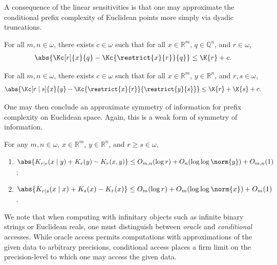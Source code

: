A consequence of the linear sensitivities is that one may approximate the conditional prefix complexity of Euclidean points more simply via dyadic truncations.

\begin{lemma}
    \label{maxmin_truncation_for_r}
    For all $m, n \in \omega$, there exists $c \in \omega$ such that for all $x \in \mathbb{R}^m$, $q \in \mathbb{Q}^n$, and $r \in \omega$,
    \begin{align*}
        \abs{\Kc[r]{x}{q} - \Kc{\restrict{x}{r}}{q}} \leq \K{r} + c.
    \end{align*}
\end{lemma}

\begin{lemma}
    \label{maxmin_truncation_for_r_s}
    For all $m, n \in \omega$, there exists $c \in \omega$ such that for all $x \in \mathbb{R}^m$, $y \in \mathbb{R}^n$, and $r, s \in \omega$,
    \begin{align*}
        \abs{\Kc[r \mid s]{x}{y} - \Kc{\restrict{x}{r}}{\restrict{y}{s}}} \leq \K{r} + \K{s} + c.
    \end{align*}
\end{lemma}

One may then conclude an approximate symmetry of information for prefix complexity on Euclidean space. Again, this is a weak form of symmetry of information.

\begin{theorem}
    \label{theorem:approximate_SOI_conditional}
    For any $m, n \in \omega$, $x \in \mathbb{R}^m$, $y \in \mathbb{R}^n$, and $r \geq s \in \omega$,
    \begin{enumerate}[label=(\roman*)]
        \item $\abs{K_{r \mid r}(x \mid y) + K_r(y) - K_{r}(x,  y)} \leq O_{m, n}(\log r) + O_n(\log \log \norm{y}) + O_{m, n}(1)$;
        \item $\abs{K_{r \mid s}(x \mid x) + K_s(x) - K_r(x)} \leq O_m(\log r) + O_m(\log \log \norm{x}) + O_m(1)$.
    \end{enumerate}
\end{theorem}

We note that when computing with infinitary objects such as infinite binary strings or Euclidean reals, one must distinguish between \textit{oracle} and \textit{conditional} accesses. While oracle access permits computations with approximations of the given data to arbitrary precisions, conditional access places a firm limit on the precision-level to which one may access the given data.


